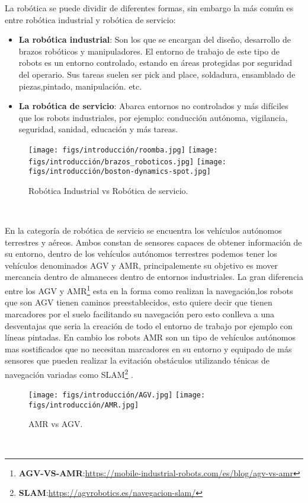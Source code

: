 \bigskip
La robótica se puede dividir de diferentes formas, sin embargo la más común es entre robótica industrial y robótica de servicio:


\begin{itemize}
  \item \textbf{La robótica industrial}: Son los que se encargan del diseño, desarrollo de brazos robóticos y manipuladores. El entorno de trabajo de este tipo de robots es un entorno controlado, estando en 
  áreas protegidas por seguridad del operario. Sus tareas suelen ser pick and place, soldadura, ensamblado de piezas,pintado, manipulación. etc. 
  \item \textbf{La robótica de servicio}: Abarca entornos no controlados y más difíciles que los robots industriales, por ejemplo: conducción autónoma, vigilancia, seguridad, sanidad, educación y más tareas. 
\end{itemize}

\begin{figure} [h!]
  \begin{center}
    \texttt{[image: figs/introducción/roomba.jpg]}
    \texttt{[image: figs/introducción/brazos\_roboticos.jpg]}
    \texttt{[image: figs/introducción/boston-dynamics-spot.jpg]}
  \end{center}
  \caption{Robótica Industrial vs Robótica de servicio.}
  \label{fig:roomba}
\end{figure}\

En la categoría de robótica de servicio se encuentra los vehículos autónomos terrestres y aéreos. Ambos constan de sensores capaces de obtener información
de su entorno, dentro de los vehículos autónomos terrestres podemos tener los vehículos denominados AGV y AMR, principalemente su objetivo es mover
mercancia dentro de almaneces dentro de entornos industriales.
\newline
La gran diferencia entre los AGV y AMR\footnote{\textbf{AGV-VS-AMR}:\url{https://mobile-industrial-robots.com/es/blog/agv-vs-amr}} esta en la forma como realizan la navegación,los robots
que son AGV tienen caminos preestablecidos, esto quiere decir que tienen marcadores por el suelo facilitando su navegación pero esto conlleva a una desventajas
que seria la creación de todo el entorno de trabajo por ejemplo con líneas pintadas. \newline
En cambio los robots AMR son un tipo de vehículos autónomos mas sostificados 
que no necesitan marcadores en su entorno y equipado de más sensores que pueden realizar la evitación obstáculos utilizando ténicas de navegación variadas como SLAM\footnote{\textbf{SLAM}:\url{https://agvrobotics.es/navegacion-slam/}} .
\newline
\begin{figure} [h!]
  \begin{center}
    \texttt{[image: figs/introducción/AGV.jpg]}
    \texttt{[image: figs/introducción/AMR.jpg]}
  \end{center}
  \caption{AMR vs AGV.}
  \label{fig:AMR}
\end{figure}\

